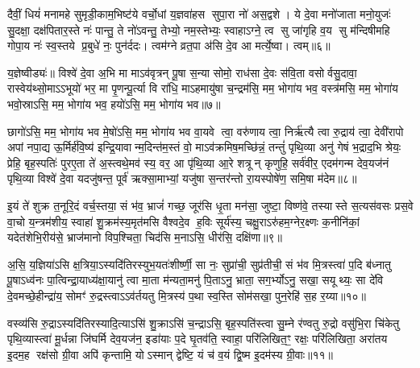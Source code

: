 {\anuvakamend[{मा॒ योनि॑रसि त्रि॒ꣳ॒शच्च॑॥२॥}]}

दैवीं॒ धियं॑ मनामहे सुमृडी॒काम॒भिष्ट॑ये वर्चो॒धां य॒ज्ञवा॑हस सुपा॒रा नो॑ अस॒द्वशे। ये दे॒वा मनो॑जाता मनो॒युजः॑ सु॒दक्षा॒ दक्ष॑पितार॒स्ते नः॑ पान्तु॒ ते नो॑ऽवन्तु॒ तेभ्यो॒ नम॒स्तेभ्यः॒ स्वाहाऽग्ने॒ त्व सु जा॑गृहि व॒य सु म॑न्दिषीमहि गोपा॒य नः॑ स्व॒स्तये प्र॒बुधे॑ नः॒ पुन॑र्ददः। त्वम॑ग्ने व्रत॒पा अ॑सि दे॒व आ मर्त्ये॒ष्वा। त्वम्॥६॥

य॒ज्ञेष्वीड्यः॑॥ विश्वे॑ दे॒वा अ॒भि मा माऽव॑वृत्रन् पू॒षा स॒न्या सोमो॒ राध॑सा दे॒वः स॑वि॒ता वसोर्वसु॒दावा॒ रास्वेय॑थ्सो॒माऽऽभूयो॑ भर॒ मा पृ॒णन्पू॒र्त्या वि रा॑धि॒ माऽहमायु॑षा च॒न्द्रम॑सि॒ मम॒ भोगा॑य भव॒ वस्त्र॑मसि॒ मम॒ भोगा॑य भवो॒स्राऽसि॒ मम॒ भोगा॑य भव॒ हयो॑ऽसि॒ मम॒ भोगा॑य भव॥७॥

छागो॑ऽसि॒ मम॒ भोगा॑य भव मे॒षो॑ऽसि॒ मम॒ भोगा॑य भव वा॒यवे त्वा॒ वरु॑णाय त्वा॒ निर्ऋ॑त्यै त्वा रु॒द्राय॑ त्वा॒ देवी॑रापो अपां नपा॒द्य ऊ॒र्मिर्\mbox{}ह॑वि॒ष्य॑ इन्द्रि॒यावान्म॒दिन्त॑म॒स्तं वो॒ माऽव॑क्रमिष॒मच्छि॑न्नं॒ तन्तुं॑ पृथि॒व्या अनु॑ गेषं भ॒द्राद॒भि श्रेयः॒ प्रेहि॒ बृह॒स्पतिः॑ पुरए॒ता ते॑ अ॒स्त्वथे॒मव॑ स्य॒ वर॒ आ पृ॑थि॒व्या आ॒रे शत्रून् कृणुहि॒ सर्व॑वीर॒ एदम॑गन्म देव॒यज॑नं पृथि॒व्या विश्वे॑ दे॒वा यदजु॑षन्त॒ पूर्व॑ ऋक्सा॒माभ्यां॒ यजु॑षा स॒न्तर॑न्तो रा॒यस्पोषे॑ण॒ समि॒षा म॑देम॥८॥

{\anuvakamend[{आ त्व हयो॑ऽसि॒ मम॒ भोगा॑य भव स्य॒ पञ्च॑विशतिश्च॥३॥}]}

इ॒यं ते॑ शुक्र त॒नूरि॒दं वर्च॒स्तया॒ सं भ॑व॒ भ्राजं॑ गच्छ॒ जूर॑सि धृ॒ता मन॑सा॒ जुष्टा॒ विष्ण॑वे॒ तस्यास्ते स॒त्यस॑वसः प्रस॒वे वा॒चो य॒न्त्रम॑शीय॒ स्वाहा॑ शु॒क्रम॑स्य॒मृत॑मसि वैश्वदे॒व ह॒विः सूर्य॑स्य॒ चक्षु॒राऽरु॑हम॒ग्नेर॒क्ष्णः क॒नीनि॑कां॒ यदेत॑शेभि॒रीय॑से॒ भ्राज॑मानो विप॒श्चिता॒ चिद॑सि म॒नाऽसि॒ धीर॑सि॒ दक्षि॑णा॥९॥

अ॒सि॒ य॒ज्ञिया॑ऽसि क्ष॒त्रिया॒ऽस्यदि॑तिरस्युभ॒यतः॑शीर्ष्णी॒ सा नः॒ सुप्रा॑ची॒ सुप्र॑तीची॒ सं भ॑व मि॒त्रस्त्वा॑ प॒दि ब॑ध्नातु पू॒षाऽध्व॑नः पा॒त्विन्द्रा॒याध्य॑क्षा॒यानु॑ त्वा मा॒ता म॑न्यता॒मनु॑ पि॒ताऽनु॒ भ्राता॒ सग॒र्भ्योऽनु॒ सखा॒ सयूथ्यः॒ सा दे॑वि दे॒वमच्छे॒हीन्द्रा॑य॒ सोमꣳ॑ रु॒द्रस्त्वाऽऽव॑र्तयतु मि॒त्रस्य॑ प॒था स्व॒स्ति सोम॑सखा॒ पुन॒रेहि॑ स॒ह र॒य्या॥१०॥

{\anuvakamend[{दक्षि॑णा॒ सोम॑सखा॒ पञ्च॑ च॥४॥}]}

वस्व्य॑सि रु॒द्राऽस्यदि॑तिरस्यादि॒त्याऽसि॑ शु॒क्राऽसि॑ च॒न्द्राऽसि॒ बृह॒स्पति॑स्त्वा सु॒म्ने र॑ण्वतु रु॒द्रो वसु॑भि॒रा चि॑केतु पृथि॒व्यास्त्वा॑ मू॒र्धन्ना जि॑घर्मि देव॒यज॑न॒ इडा॑याः प॒दे घृ॒तव॑ति॒ स्वाहा॒ परि॑लिखित॒ꣳ॒ रक्षः॒ परि॑लिखिता॒ अरा॑तय इ॒दम॒ह रक्ष॑सो ग्री॒वा अपि॑ कृन्तामि॒ योऽस्मान् द्वेष्टि॒ यं च॑ व॒यं द्वि॒ष्म इ॒दम॑स्य ग्री॒वाः॥११॥

